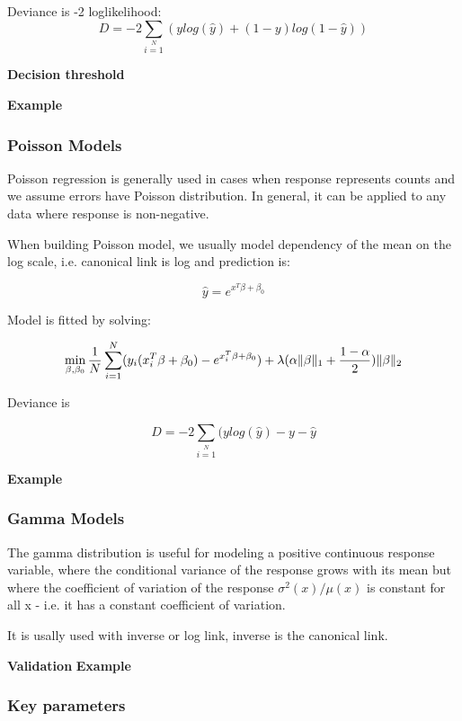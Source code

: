\documentclass[11pt]{article}
\begin{document}
Deviance is -2 loglikelihood:
\[D = -2\sum\limits_{i=1}\limits^{N}{(y log(\hat{y}) + (1 - y)log(1-\hat{y})  )}\]

\textbf{Decision threshold}

\textbf{Example}

\subsubsection{Poisson Models}
Poisson regression is generally used in cases when response represents counts and we assume errors have Poisson distribution. In general, it can be applied to any data where response is non-negative. 

When building Poisson model, we usually model dependency of the mean on the log scale, i.e. canonical link is log and prediction is:

\[\hat{y} = e^{x^T\beta + \beta_0}\]

Model is fitted by solving:

\[  \min\limits_{\beta,\beta_0} { {1 \over N}\sum\limits_{i=1}\limits^{N}(y_i (x_i^{T}\beta  + \beta_0) - e^{x_i^{T}\beta  + \beta_0})  + \lambda (\alpha \|\beta \|_1 + {1-\alpha \over 2}) \|\beta\|_2} \]

Deviance is 

\[D = -2\sum\limits_{i=1}\limits^{N}{(y log(\hat{y}) - y - \hat{y}}\]


\textbf{Example}

\subsubsection{Gamma Models}
The gamma distribution is useful for modeling a positive continuous response variable, where the conditional variance of the response grows with its mean but where the coefficient of variation of the response $\sigma^2(x)/μ(x)$ is constant for all x - i.e. it has a constant coefficient of variation.

It is usally used with inverse or log link, inverse is the canonical link.


\textbf{Validation}
\textbf{Example}


\subsubsection{Key parameters}
\end{document}
